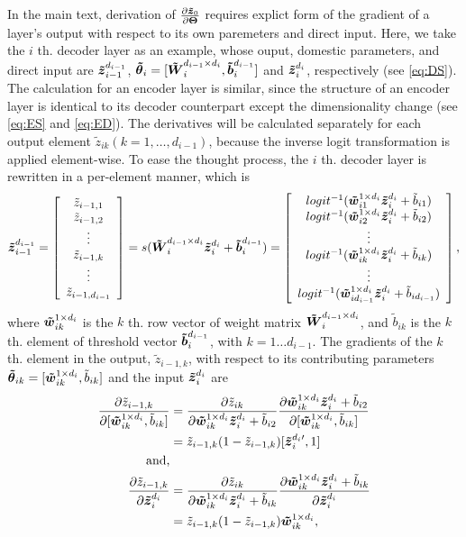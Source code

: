 In the main text, derivation of $\PDV{\zDC_0}{\Par}$ requires explict form of the gradient of a layer's output with respect to its own paremeters and direct input. Here, we take the $i$ th. decoder layer as an example, whose ouput, domestic parameters, and direct input are $\zDI{i-1}{i-1}$, $\pDC_{i}=[\WDI{i}{i-1}{i}, \bDI{i}{i-1}]$ and $\zDI{i}{i}$, respectively (see \ref{eq:DS}). The calculation for an encoder layer is similar, since the structure of an encoder layer is identical to its decoder counterpart except the dimensionality change (see \ref{eq:ES} and \ref{eq:ED}). The derivatives will be calculated separately for each output element $\tilde{z}_{ik} (k=1,\dots,d_{i-1})$, because the inverse logit transformation is applied element-wise. To ease the thought process, the $i$ th. decoder layer is rewritten in a per-element manner, which is
\begin{equation*}
  \zDI{i-1}{i-1} = 
  \left[\begin{array}{c}
      \tilde{z}_{i-1,1} \\ 
      \tilde{z}_{i-1,2} \\ \vdots \\
      \tilde{z}_{i-1,k} \\ \vdots \\
      \tilde{z}_{i-1,d_{i-1}}
    \end{array}\right]
  = s(\WDI{i}{i-1}{i} \zDI{i}{i} + \bDI{i}{i-1})
  = \left[ \begin{array}{c}
      logit^{-1}(\wDI{i1}{i} \zDI{i}{i} + \tilde{b}_{i1}) \\
      logit^{-1}(\wDI{i2}{i} \zDI{i}{i} + \tilde{b}_{i2}) \\ \vdots \\
      logit^{-1}(\wDI{ik}{i} \zDI{i}{i} + \tilde{b}_{ik}) \\ \vdots \\
      logit^{-1}(\wDI{id_{i-1}}{i} \zDI{i}{i} + \tilde{b}_{id_{i-1}}) \\
    \end{array} \right],
\end{equation*}
where $\wDI{ik}{i}$ is the $k$ th. row vector of weight matrix $\WDI{i}{i-1}{i}$, and $\tilde{b}_{ik}$ is the $k$ th. element of threshold vector $\bDI{i}{i-1}$, with $k=1 \dots d_{i-1}$. The gradients of the $k$ th. element in the output, $\tilde{z}_{i-1,k}$, with respect to its contributing parameters $\pDC_{ik}=[\wDI{ik}{i}, \tilde{b}_{ik}]$ and the input $\zDI{i}{i}$ are
\begin{equation*}
  \begin{split}
    \PDV{\tilde{z}_{i-1,k}}{[\wDI{ik}{i}, \tilde{b}_{ik}]}
    &= \PDC{\tilde{z}_{ik}}{\wDI{ik}{i} \zDI{i}{i} + \tilde{b}_{i2}}{[\wDI{ik}{i}, \tilde{b}_{ik}]} \\
    &= \tilde{z}_{i-1,k}(1-\tilde{z}_{i-1,k})[\zDIt{i}{i},1] \\
    \text{and,} & \\
    \PDV{\tilde{z}_{i-1,k}}{\zDI{i}{i}}
    &= \PDC{\tilde{z}_{ik}}{\wDI{ik}{i} \zDI{i}{i} + \tilde{b}_{ik}}{\zDI{i}{i}} \\
    &= \tilde{z}_{i-1,k}(1-\tilde{z}_{i-1,k})\wDI{ik}{i},
  \end{split}
\end{equation*}
